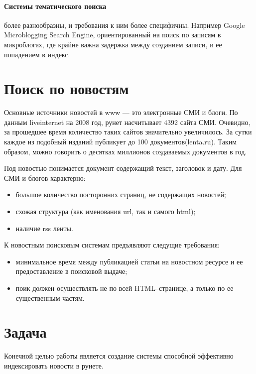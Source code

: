 \paragraph{Системы тематического поиска} более разнообразны, и требования к ним более специфичны.
 Например Google Microblogging Search Engine, ориентированный на поиск по записям в микроблогах,
где крайне важна задержка между созданием записи, и ее попадением в индекс.

\section{Поиск по новостям}

Основные источники новостей в www --- это электронные СМИ и блоги. По данным
liveinternet на 2008 год, рунет насчитывает 4392 сайта СМИ. 
Очевидно, за прошедшее время количество таких сайтов значительно увеличилось. За сутки каждое
из подобный изданий публикует до 100 документов(lenta.ru). Таким образом, 
можно говорить о десятках миллионов создаваемых документов в год.

Под новостью понимается документ содержащий текст, заголовок и дату. Для СМИ и
блогов характерно:
\begin{itemize} 
 \item большое количество посторонних страниц, не содержащих новостей;
 \item схожая структура (как именования url, так и самого html);
 \item наличие rss ленты.
\end{itemize}

К новостным поисковым системам предъявляют следущие требования:
\begin{itemize} 
\item минимальное время между публикацией статьи на новостном ресурсе и ее 
    предоставление в поисковой выдаче;
\item поик должен осуществлять не по всей HTML--странице, а только по ее 
    существенным частям. 
\end{itemize}

\section{Задача}
Конечной целью работы является создание системы способной эффективно индексировать новости в рунете.

